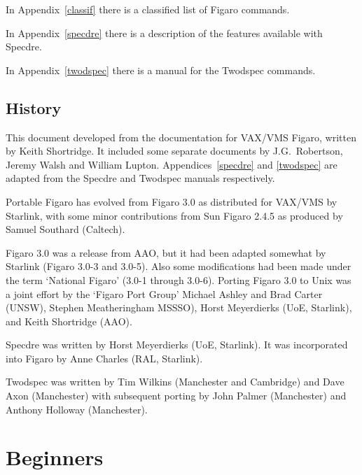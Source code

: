 \documentclass[11pt,twoside]{article}
\newcommand{\stardocinitials}  {SUN}
\newcommand{\stardocnumber}    { 86.21}
\newcommand{\stardocname}{\stardocinitials /\stardocnumber}
\newcommand{\htmlref}[2]{#1}
\newcommand{\xlabel}[1]{}
\newcommand{\latorhtm}[2]{#1}
\newcommand{\latorhtm}[2]{#2}
\begin{document}
In \latorhtm{Appendix~\ref{classif}}{the \htmlref{Appendix}{classif}}
there is a classified list of Figaro commands.

In \latorhtm{Appendix~\ref{specdre}}{the \htmlref{Appendix}{specdre}}
there is a description of the features available with Specdre.

In \latorhtm{Appendix~\ref{twodspec}}{the \htmlref{Appendix}{twodspec}}
there is a manual for the Twodspec commands.

\subsection{\xlabel{history}History}

This document developed from the documentation for VAX/VMS Figaro,
written by Keith Shortridge. It included some separate documents by
J.G.~Robertson, Jeremy Walsh and William Lupton.
\latorhtm{Appendices~\ref{specdre} and \ref{twodspec}}
{The \htmlref{Specdre Appendix}{specdre} and the
\htmlref{Twodspec Appendix}{twodspec}}
are adapted from the Specdre and Twodspec manuals respectively.

Portable Figaro has evolved from Figaro 3.0 as distributed for VAX/VMS
by Starlink, with some minor contributions from Sun Figaro 2.4.5 as
produced by Samuel Southard (Caltech).

Figaro 3.0 was a release from AAO, but it had been adapted somewhat
by Starlink (Figaro 3.0-3 and 3.0-5). Also some modifications had
been made under the term `National Figaro' (3.0-1 through 3.0-6).
Porting Figaro 3.0 to Unix was a joint effort by the `Figaro Port
Group' Michael Ashley and Brad Carter (UNSW), Stephen Meatheringham
MSSSO), Horst Meyerdierks (UoE, Starlink), and Keith Shortridge (AAO).

Specdre was written by Horst Meyerdierks (UoE, Starlink).  It was
incorporated into Figaro by Anne Charles (RAL, Starlink).

Twodspec was written by Tim Wilkins (Manchester and Cambridge) and Dave
Axon (Manchester) with subsequent porting by John Palmer (Manchester) and
Anthony Holloway (Manchester).


\newpage %
\section{\xlabel{beginners}\label{beginners}Beginners}
\markboth{Beginners guide}{\stardocname}
\end{document}
